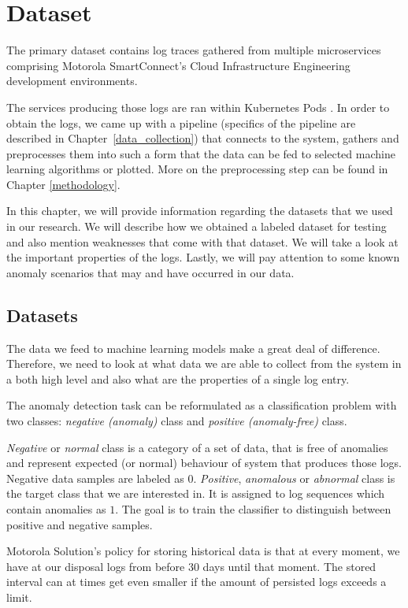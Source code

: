 \chapter{Dataset}
\label{chapter:dataset}

The primary dataset contains log traces gathered from multiple microservices comprising Motorola SmartConnect's Cloud Infrastructure Engineering development environments.

The services producing those logs are ran within Kubernetes Pods \cite{K8s:pods}. 
In order to obtain the logs, we came up with a pipeline (specifics of the pipeline are described in Chapter~\ref{data_collection}) that connects to the system, gathers and preprocesses them into such a form that the data can be fed to selected machine learning algorithms or plotted.
More on the preprocessing step can be found in Chapter \ref{methodology}.

In this chapter, we will provide information regarding the datasets that we used in our research. We will describe how we obtained a labeled dataset for testing and also mention weaknesses that come with that dataset. We will take a look at the important properties of the logs. Lastly, we will pay attention to some known anomaly scenarios that may and have occurred in our data.  

\section{Datasets}
\label{dataset}
The data we feed to machine learning models make a great deal of difference. Therefore, we need to look at what data we are able to collect from the system in a both high level and also what are the properties of a single log entry.

The anomaly detection task can be reformulated as a classification problem with two classes: \textit{negative (anomaly)} class and \textit{positive (anomaly-free)} class. 

\textit{Negative} or \textit{normal} class is a category of a set of data, that is free of anomalies and represent expected (or normal) behaviour of system that produces those logs. Negative data samples are labeled as $0$. \textit{Positive}, \textit{anomalous} or \textit{abnormal} class is the target class that we are interested in. It is assigned to log sequences which contain anomalies as $1$. The goal is to train the classifier to distinguish between positive and negative samples.

Motorola Solution's policy for storing historical data is that at every moment, we have at our disposal logs from before 30 days until that moment. The stored interval can at times get even smaller if the amount of persisted logs exceeds a limit.

